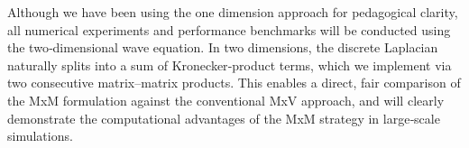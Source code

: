 Although we have been using the one dimension approach for pedagogical clarity, all numerical experiments and performance benchmarks will be conducted using the two‐dimensional wave equation.  In two dimensions, the discrete Laplacian naturally splits into a sum of Kronecker‐product terms, which we implement via two consecutive matrix–matrix products.  This enables a direct, fair comparison of the MxM formulation against the conventional MxV approach, and will clearly demonstrate the computational advantages of the MxM strategy in large‐scale simulations.

\clearpage